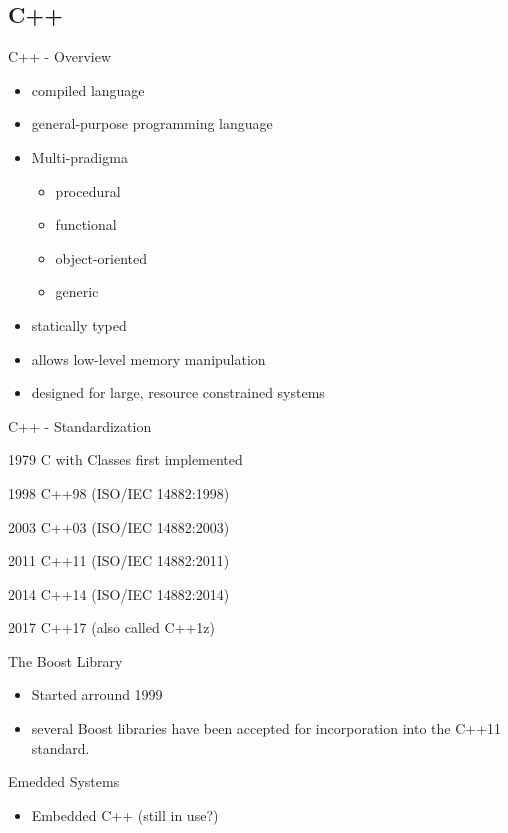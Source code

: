 \documentclass{beamer}
\begin{document}
\subsection{C++}
\begin{frame}{C++ - Overview}
\begin{itemize}
  \item compiled language
  \item general-purpose programming language
  \item Multi-pradigma
  \begin{itemize}
    \item procedural
    \item functional
    \item object-oriented
    \item generic
  \end{itemize}
  \item statically typed
  \item allows low-level memory manipulation
  \item designed for large, resource constrained systems 
\end{itemize}
\end{frame}


\begin{frame}{C++ - Standardization}
\itemize{}
\item[1979] C with Classes first implemented 
\item[1998] C++98 (ISO/IEC 14882:1998)
\item[2003] C++03 (ISO/IEC 14882:2003)
\item[2011] C++11 (ISO/IEC 14882:2011)
\item[2014] C++14 (ISO/IEC 14882:2014)
\item[2017] C++17 (also called C++1z)
\end{frame}

\begin{frame}{The Boost Library}
\begin{itemize}
  \item Started arround 1999
  \item several Boost libraries have been accepted for incorporation into the
  C++11 standard.
\end{itemize}
\end{frame}

\begin{frame}{Emedded Systems}
\begin{itemize}
  \item Embedded C++ (still in use?)
\end{itemize}
\end{frame}
\end{document}
